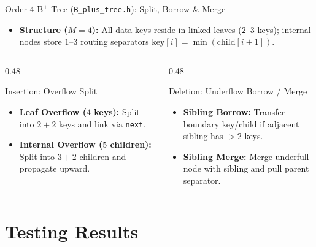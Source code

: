 \documentclass[aspectratio=169, 10pt, xcolor={x11names}]{beamer}
\newcommand{\code}[1]{\texttt{\color{primary!90!black}#1}}
\newcommand{\id}[1]{\ensuremath{\mathrm{#1}}}
\begin{document}
\begin{frame}{Order-$4$ $\text{B}^+$ Tree (\texttt{B\_plus\_tree.h}): Split, Borrow \& Merge}
\begin{itemize}\setlength{\itemsep}{0.35em}\footnotesize
  \item \textbf{Structure ($M = 4$):} All data keys reside in linked leaves ($2\text{--}3$ keys); internal nodes store $1\text{--}3$ routing separators $\id{key}[i] = \min(\id{child}[i+1])$.
\end{itemize}

\vspace{0.2em}
\begin{columns}[T,onlytextwidth]
\begin{column}{0.48\textwidth}
\begin{block}{\footnotesize Insertion: Overflow Split}
\footnotesize
\begin{itemize}\setlength{\itemsep}{0.35em}
  \item \textbf{Leaf Overflow ($4$ keys):} Split into $2 + 2$ keys and link via \code{next}.
  \item \textbf{Internal Overflow ($5$ children):} Split into $3 + 2$ children and propagate upward.
\end{itemize}
\end{block}
\end{column}

\begin{column}{0.48\textwidth}
\begin{exampleblock}{\footnotesize Deletion: Underflow Borrow / Merge}
\footnotesize
\begin{itemize}\setlength{\itemsep}{0.35em}
  \item \textbf{Sibling Borrow:} Transfer boundary key/child if adjacent sibling has $>2$ keys.
  \item \textbf{Sibling Merge:} Merge underfull node with sibling and pull parent separator.
\end{itemize}
\end{exampleblock}
\end{column}
\end{columns}
\end{frame}

\section{Testing Results}
\end{document}
